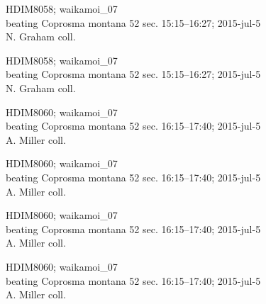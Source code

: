 \documentclass[2pt]{extarticle}
\begin{document}
\noindent
\parbox{0.16\textwidth}{\tiny \raggedright \rule[-0.3\baselineskip]{0pt}{10pt}HDIM8058; waikamoi\_07\\ beating Coprosma montana 52 sec. 15:15--16:27; 2015-jul-5\\ N. Graham coll.}
\parbox{0.16\textwidth}{\tiny \raggedright \rule[-0.3\baselineskip]{0pt}{10pt}HDIM8058; waikamoi\_07\\ beating Coprosma montana 52 sec. 15:15--16:27; 2015-jul-5\\ N. Graham coll.}
\parbox{0.16\textwidth}{\tiny \raggedright \rule[-0.3\baselineskip]{0pt}{10pt}HDIM8060; waikamoi\_07\\ beating Coprosma montana 52 sec. 16:15--17:40; 2015-jul-5\\ A. Miller coll.}
\parbox{0.16\textwidth}{\tiny \raggedright \rule[-0.3\baselineskip]{0pt}{10pt}HDIM8060; waikamoi\_07\\ beating Coprosma montana 52 sec. 16:15--17:40; 2015-jul-5\\ A. Miller coll.}
\parbox{0.16\textwidth}{\tiny \raggedright \rule[-0.3\baselineskip]{0pt}{10pt}HDIM8060; waikamoi\_07\\ beating Coprosma montana 52 sec. 16:15--17:40; 2015-jul-5\\ A. Miller coll.}
\parbox{0.16\textwidth}{\tiny \raggedright \rule[-0.3\baselineskip]{0pt}{10pt}HDIM8060; waikamoi\_07\\ beating Coprosma montana 52 sec. 16:15--17:40; 2015-jul-5\\ A. Miller coll.} \\ 
\vspace{0.001in} 
\end{document}
